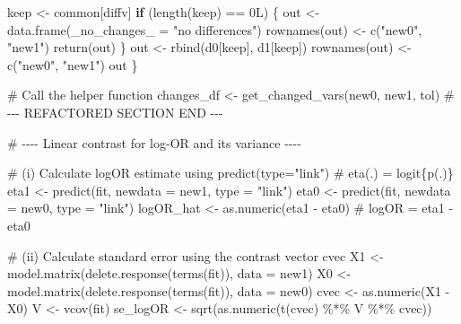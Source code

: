 \documentclass[
  letterpaper,
  DIV=11,
  numbers=noendperiod]{scrreprt}
\newenvironment{Shaded}{\begin{snugshade}}{\end{snugshade}}
\newcommand{\AttributeTok}[1]{\textcolor[rgb]{0.40,0.45,0.13}{#1}}
\newcommand{\CommentTok}[1]{\textcolor[rgb]{0.37,0.37,0.37}{#1}}
\newcommand{\ControlFlowTok}[1]{\textcolor[rgb]{0.00,0.23,0.31}{\textbf{#1}}}
\newcommand{\DecValTok}[1]{\textcolor[rgb]{0.68,0.00,0.00}{#1}}
\newcommand{\FunctionTok}[1]{\textcolor[rgb]{0.28,0.35,0.67}{#1}}
\newcommand{\NormalTok}[1]{\textcolor[rgb]{0.00,0.23,0.31}{#1}}
\newcommand{\OtherTok}[1]{\textcolor[rgb]{0.00,0.23,0.31}{#1}}
\newcommand{\RegionMarkerTok}[1]{\textcolor[rgb]{0.00,0.23,0.31}{#1}}
\newcommand{\SpecialCharTok}[1]{\textcolor[rgb]{0.37,0.37,0.37}{#1}}
\newcommand{\StringTok}[1]{\textcolor[rgb]{0.13,0.47,0.30}{#1}}
\begin{document}
\begin{Shaded}
\begin{Highlighting}[]
\NormalTok{    keep }\OtherTok{\textless{}{-}}\NormalTok{ common[diffv]}
    \ControlFlowTok{if}\NormalTok{ (}\FunctionTok{length}\NormalTok{(keep) }\SpecialCharTok{==} \DecValTok{0}\NormalTok{L) \{}
\NormalTok{      out }\OtherTok{\textless{}{-}} \FunctionTok{data.frame}\NormalTok{(}\StringTok{\textasciigrave{}}\AttributeTok{\_no\_changes\_}\StringTok{\textasciigrave{}} \OtherTok{=} \StringTok{"no differences"}\NormalTok{)}
      \FunctionTok{rownames}\NormalTok{(out) }\OtherTok{\textless{}{-}} \FunctionTok{c}\NormalTok{(}\StringTok{"new0"}\NormalTok{, }\StringTok{"new1"}\NormalTok{)}
      \FunctionTok{return}\NormalTok{(out)}
\NormalTok{    \}}
\NormalTok{    out }\OtherTok{\textless{}{-}} \FunctionTok{rbind}\NormalTok{(d0[keep], d1[keep])}
    \FunctionTok{rownames}\NormalTok{(out) }\OtherTok{\textless{}{-}} \FunctionTok{c}\NormalTok{(}\StringTok{"new0"}\NormalTok{, }\StringTok{"new1"}\NormalTok{)}
\NormalTok{    out}
\NormalTok{  \}}
  
  \CommentTok{\# Call the helper function}
\NormalTok{  changes\_df }\OtherTok{\textless{}{-}} \FunctionTok{get\_changed\_vars}\NormalTok{(new0, new1, tol)}
  \CommentTok{\# {-}{-}{-} REFACTORED SECTION }\RegionMarkerTok{END}\CommentTok{ {-}{-}{-}}


  \CommentTok{\# {-}{-}{-}{-} Linear contrast for log{-}OR and its variance {-}{-}{-}{-}}
  
  \CommentTok{\# (i) Calculate logOR estimate using predict(type="link")}
  \CommentTok{\# eta(.) = logit\{p(.)\}}
\NormalTok{  eta1 }\OtherTok{\textless{}{-}} \FunctionTok{predict}\NormalTok{(fit, }\AttributeTok{newdata =}\NormalTok{ new1, }\AttributeTok{type =} \StringTok{"link"}\NormalTok{)}
\NormalTok{  eta0 }\OtherTok{\textless{}{-}} \FunctionTok{predict}\NormalTok{(fit, }\AttributeTok{newdata =}\NormalTok{ new0, }\AttributeTok{type =} \StringTok{"link"}\NormalTok{)}
\NormalTok{  logOR\_hat }\OtherTok{\textless{}{-}} \FunctionTok{as.numeric}\NormalTok{(eta1 }\SpecialCharTok{{-}}\NormalTok{ eta0) }\CommentTok{\# logOR = eta1 {-} eta0}
  
  \CommentTok{\# (ii) Calculate standard error using the contrast vector \textquotesingle{}cvec\textquotesingle{}}
\NormalTok{  X1 }\OtherTok{\textless{}{-}} \FunctionTok{model.matrix}\NormalTok{(}\FunctionTok{delete.response}\NormalTok{(}\FunctionTok{terms}\NormalTok{(fit)), }\AttributeTok{data =}\NormalTok{ new1)}
\NormalTok{  X0 }\OtherTok{\textless{}{-}} \FunctionTok{model.matrix}\NormalTok{(}\FunctionTok{delete.response}\NormalTok{(}\FunctionTok{terms}\NormalTok{(fit)), }\AttributeTok{data =}\NormalTok{ new0)}
\NormalTok{  cvec      }\OtherTok{\textless{}{-}} \FunctionTok{as.numeric}\NormalTok{(X1 }\SpecialCharTok{{-}}\NormalTok{ X0)}
\NormalTok{  V         }\OtherTok{\textless{}{-}} \FunctionTok{vcov}\NormalTok{(fit)}
\NormalTok{  se\_logOR  }\OtherTok{\textless{}{-}} \FunctionTok{sqrt}\NormalTok{(}\FunctionTok{as.numeric}\NormalTok{(}\FunctionTok{t}\NormalTok{(cvec) }\SpecialCharTok{\%*\%}\NormalTok{ V }\SpecialCharTok{\%*\%}\NormalTok{ cvec))}


\end{Highlighting}
\end{Shaded}
\end{document}
